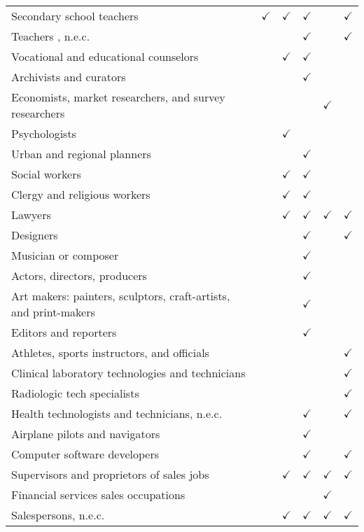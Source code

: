 \begin{tabular}[t]{llllll}
Secondary school teachers & $\checkmark$ & $\checkmark$ & $\checkmark$ &  & $\checkmark$\\
Teachers , n.e.c. &  &  & $\checkmark$ &  & $\checkmark$\\
Vocational and educational counselors &  & $\checkmark$ & $\checkmark$ &  & \\
Archivists and curators &  &  & $\checkmark$ &  & \\
Economists, market researchers, and survey researchers &  &  &  & $\checkmark$ & \\
Psychologists &  & $\checkmark$ &  &  & \\
Urban and regional planners &  &  & $\checkmark$ &  & \\
Social workers &  & $\checkmark$ & $\checkmark$ &  & \\
Clergy and religious workers &  & $\checkmark$ & $\checkmark$ &  & \\
Lawyers &  & $\checkmark$ & $\checkmark$ & $\checkmark$ & $\checkmark$\\
Designers &  &  & $\checkmark$ &  & $\checkmark$\\
Musician or composer &  &  & $\checkmark$ &  & \\
Actors, directors, producers &  &  & $\checkmark$ &  & \\
Art makers: painters, sculptors, craft-artists, and print-makers &  &  & $\checkmark$ &  & \\
Editors and reporters &  &  & $\checkmark$ &  & \\
Athletes, sports instructors, and officials &  &  &  &  & $\checkmark$\\
Clinical laboratory technologies and technicians &  &  &  &  & $\checkmark$\\
Radiologic tech specialists &  &  &  &  & $\checkmark$\\
Health technologists and technicians, n.e.c. &  &  & $\checkmark$ &  & $\checkmark$\\
Airplane pilots and navigators &  &  & $\checkmark$ &  & \\
Computer software developers &  &  & $\checkmark$ &  & $\checkmark$\\
Supervisors and proprietors of sales jobs &  & $\checkmark$ & $\checkmark$ & $\checkmark$ & $\checkmark$\\
Financial services sales occupations &  &  &  & $\checkmark$ & \\
Salespersons, n.e.c. &  & $\checkmark$ & $\checkmark$ & $\checkmark$ & $\checkmark$\\

\end{tabular}
